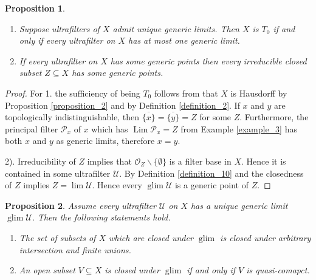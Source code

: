 \documentclass[8pt]{article}
\numberwithin{equation}{section}
\newtheorem{proposition}{Proposition}[subsection]
\DeclareMathOperator{\Lim}{Lim}
\DeclareMathOperator{\glim}{glim}
\newcommand{\Ouv}{\mathscr{O}}
\newcommand{\U}[0]{\mathcal{U}}
\begin{document}
\begin{proposition}$\:$
    \label{fact_14_a}
    \begin{enumerate}[1.]
        \item Suppose ultrafilters of $X$ admit unique generic limits. Then $X$ is $T_0$ if and only if every ultrafilter on $X$ has at most one generic limit.
        \item If every ultrafilter on $X$ has some generic points then every irreducible closed subset $Z\subseteq X$ has some generic points.
    \end{enumerate}
\end{proposition}
\begin{proof}
    For 1. the sufficiency of being $T_0$ follows from that $X$ is Hausdorff by Proposition \ref{proposition_2} and by Definition \ref{definition_2}. If $x$ and $y$ are topologically indistinguishable, then $\overline{\{x\}} = \overline{\{y\}} =Z$ for some $Z$. Furthermore, the principal filter $\mathcal{P}_x$ of $x$ which has $\Lim\mathcal{P}_x = Z$ from Example \ref{example_3} has both $x$ and $y$ as generic limits, therefore $x=y$.
    \par 2). Irreducibility of $Z$ implies that $\Ouv_Z\backslash\{\emptyset\}$ is a filter base in $X$. Hence it is contained in some ultrafilter $\U$. By Definition \ref{definition_10} and the closedness of $Z$ implies $Z=\lim\U$. Hence every $\glim\U$ is a generic point of $Z$. 
\end{proof}
\begin{proposition}
    \label{fact_14_b}
    Assume every ultrafilter $\U$ on $X$ has a unique generic limit $\glim\U$. Then the following statements hold.
    \begin{enumerate}[1.]
        \item  The set of subsets of $X$ which are closed under $\glim$ is closed under arbitrary intersection and finite unions.
        \item An open subset $V\subseteq X$ is closed under $\glim$ if and only if $V$ is quasi-comapct.
    \end{enumerate}
\end{proposition}
\end{document}

